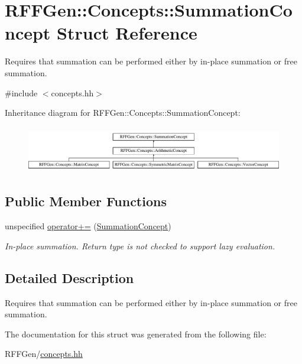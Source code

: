 \hypertarget{structRFFGen_1_1Concepts_1_1SummationConcept}{\section{R\-F\-F\-Gen\-:\-:Concepts\-:\-:Summation\-Concept Struct Reference}
\label{structRFFGen_1_1Concepts_1_1SummationConcept}
}


Requires that summation can be performed either by in-\/place summation or free summation.  




{\ttfamily \#include $<$concepts.\-hh$>$}

Inheritance diagram for R\-F\-F\-Gen\-:\-:Concepts\-:\-:Summation\-Concept\-:\begin{figure}[H]
\begin{center}
\leavevmode
\includegraphics[height=2.058824cm]{structRFFGen_1_1Concepts_1_1SummationConcept}
\end{center}
\end{figure}
\subsection*{Public Member Functions}
\begin{DoxyCompactItemize}
\item 
\hypertarget{structRFFGen_1_1Concepts_1_1SummationConcept_adc0349034311b99726f0c845d8c06a33}{unspecified \hyperlink{structRFFGen_1_1Concepts_1_1SummationConcept_adc0349034311b99726f0c845d8c06a33}{operator+=} (\hyperlink{structRFFGen_1_1Concepts_1_1SummationConcept}{Summation\-Concept})}\label{structRFFGen_1_1Concepts_1_1SummationConcept_adc0349034311b99726f0c845d8c06a33}

\begin{DoxyCompactList}\small\item\em In-\/place summation. Return type is not checked to support lazy evaluation. \end{DoxyCompactList}\end{DoxyCompactItemize}


\subsection{Detailed Description}
Requires that summation can be performed either by in-\/place summation or free summation. 

The documentation for this struct was generated from the following file\-:\begin{DoxyCompactItemize}
\item 
R\-F\-F\-Gen/\hyperlink{concepts_8hh}{concepts.\-hh}\end{DoxyCompactItemize}
